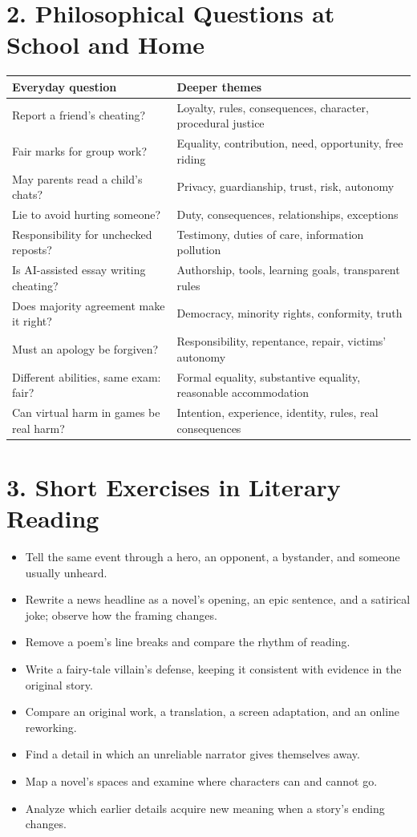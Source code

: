 \section*{2. Philosophical Questions at School and Home}
\noindent
\begin{tabularx}{\linewidth}{lX}
\toprule
Everyday question & Deeper themes \\
\midrule
Report a friend's cheating? & Loyalty, rules, consequences, character, procedural justice \\
Fair marks for group work? & Equality, contribution, need, opportunity, free riding \\
May parents read a child's chats? & Privacy, guardianship, trust, risk, autonomy \\
Lie to avoid hurting someone? & Duty, consequences, relationships, exceptions \\
Responsibility for unchecked reposts? & Testimony, duties of care, information pollution \\
Is AI-assisted essay writing cheating? & Authorship, tools, learning goals, transparent rules \\
Does majority agreement make it right? & Democracy, minority rights, conformity, truth \\
Must an apology be forgiven? & Responsibility, repentance, repair, victims' autonomy \\
Different abilities, same exam: fair? & Formal equality, substantive equality, reasonable accommodation \\
Can virtual harm in games be real harm? & Intention, experience, identity, rules, real consequences \\
\bottomrule
\end{tabularx}
\section*{3. Short Exercises in Literary Reading}
\begin{itemize}
\item Tell the same event through a hero, an opponent, a bystander, and someone usually unheard.
\item Rewrite a news headline as a novel's opening, an epic sentence, and a satirical joke; observe how the framing changes.
\item Remove a poem's line breaks and compare the rhythm of reading.
\item Write a fairy-tale villain's defense, keeping it consistent with evidence in the original story.
\item Compare an original work, a translation, a screen adaptation, and an online reworking.
\item Find a detail in which an unreliable narrator gives themselves away.
\item Map a novel's spaces and examine where characters can and cannot go.
\item Analyze which earlier details acquire new meaning when a story's ending changes.
\end{itemize}
